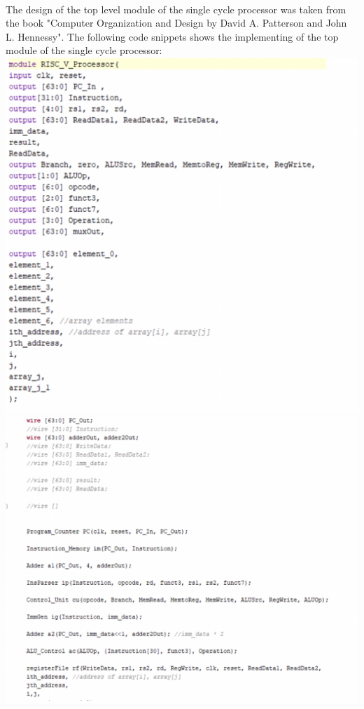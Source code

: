 \documentclass[a4paper, 12pt]{report}
\begin{document}
\pagebreak
\\The design of the top level module of the single cycle processor was taken from the book "Computer Organization and Design by David A. Patterson and John L. Hennessy".
The following code snippets shows the implementing of the top module of the single cycle processor:
\\\includegraphics[scale = 0.5]{sc top 1.png}
\\\includegraphics[scale = 0.5]{sc top 2.png}
\end{document}
